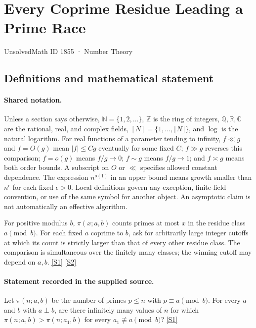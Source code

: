 \documentclass[11pt,a4paper]{article}
\newcommand{\N}{\mathbb{N}}
\newcommand{\Z}{\mathbb{Z}}
\newcommand{\Q}{\mathbb{Q}}
\newcommand{\R}{\mathbb{R}}
\newcommand{\C}{\mathbb{C}}
\newcommand{\sref}[2]{\hyperlink{source:#1:#2}{[S#2]}}
\begin{document}

\setcounter{section}{1854}

\section{Every Coprime Residue Leading a Prime Race}\label{1855}

{\small\sffamily UnsolvedMath ID 1855 · Number Theory}

\subsection{Definitions and mathematical statement}

\paragraph{Shared notation.}Unless a section says otherwise, $\N=\{1,2,\ldots\}$,
$\Z$ is the ring of integers, $\Q,\R,\C$ are the rational, real, and complex
fields, $[N]=\{1,\ldots,\lfloor N\rfloor\}$, and $\log$ is the natural
logarithm. For real functions of a parameter tending to infinity,
$f\ll g$ and $f=O(g)$ mean $|f|\leq Cg$ eventually for some fixed $C$;
$f\gg g$ reverses this comparison; $f=o(g)$ means $f/g\to0$;
$f\sim g$ means $f/g\to1$; and $f\asymp g$ means both order bounds.
A subscript on $O$ or $\ll$ specifies allowed constant dependence.
The expression $n^{o(1)}$ in an upper bound means growth smaller than
$n^\epsilon$ for each fixed $\epsilon>0$. Local definitions govern any
exception, finite-field convention, or use of the same symbol for another
object. An asymptotic claim is not automatically an effective algorithm.



For positive modulus $b$, $\pi(x;a,b)$ counts primes at most $x$ in the residue class $a\pmod b$. For each fixed $a$ coprime to $b$, ask for arbitrarily large integer cutoffs at which its count is strictly larger than that of every other residue class. The comparison is simultaneous over the finitely many classes; the winning cutoff may depend on $a,b$. \sref{1855}{1} \sref{1855}{2}

\paragraph{Statement recorded in the supplied source.}
Let $\pi(n; a, b)$ be the number of primes $p \le n$ with $p \equiv a \pmod b$. For every $a$ and $b$ with $a \perp b$, are there infinitely many values of $n$ for which $\pi(n; a, b) > \pi(n; a_1, b)$ for every $a_1 \not\equiv a \pmod b$? \sref{1855}{1}
\end{document}
